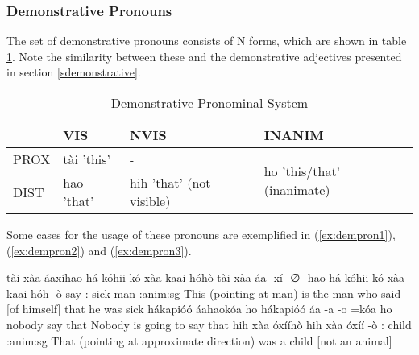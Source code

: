 \documentclass[a4paper, 12pt, oneside]{memoir}
\begin{document}
\subsubsection{Demonstrative Pronouns}
The set of demonstrative pronouns consists of N forms, which are shown in table \ref{t:dempron}. Note the similarity between these and the demonstrative adjectives presented in section \ref{sdemonstrative}.
\begin{table}[H]
\begin{tabular}{@{}llll@{}}
\toprule
     & VIS        & NVIS                     & INANIM                                      \\ \midrule
PROX & tài 'this' & -                        & \multirow{2}{*}{ho 'this/that' (inanimate)} \\
DIST & hao 'that' & hih 'that' (not visible) &                                           \\ \bottomrule
\end{tabular}
\caption{Demonstrative Pronominal System}
\label{t:dempron}
\end{table}
Some cases for the usage of these pronouns are exemplified in (\ref{ex:dempron1}), (\ref{ex:dempron2}) and (\ref{ex:dempron3}).
\begin{examples}
\ex \label{ex:dempron1}
\words tài xàa áaxíhao há kóhii kó xàa kaai hóhò
\bits tài xàa áa -xí -∅ -hao há kóhii kó xàa kaai hóh -ò  
\gloss {\Demprox} {\Cop} say {\Rpasto} {\St} {\Dem} {\Cngr} {\C} {\Tsm}:{\Subject} {\Cop} sick man {\Cl}:anim:sg
\tr This (pointing at man) is the man who said [of himself] that he was sick
\ex \label{ex:dempron2}
\words hákapióó áahaokóa ho
\bits hákapióó áa -a -o =kóa ho
\gloss nobody say {\St} {\Fut} {\Decl} that
\tr Nobody is going to say that
\ex \label{ex:dempron3}
\words hih xàa óxííhò
\bits hih xàa óxíí -ò 
\gloss  {\Dem}:{\Nvis} {\Cop} child {\Cl}:anim:sg
\tr That (pointing at approximate direction) was a child [not an animal]
\end{examples}
\end{document}

